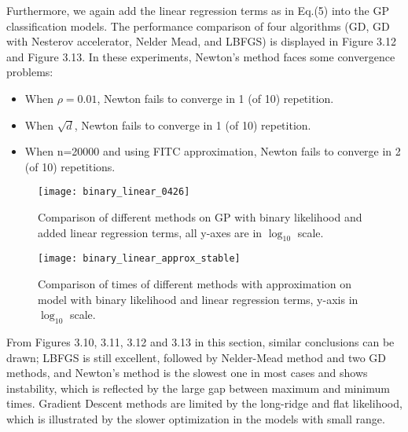 Furthermore, we again add the linear regression terms as in Eq.(5) into the GP classification models. The performance comparison of four algorithms (GD, GD with Nesterov accelerator, Nelder Mead, and LBFGS) is displayed in Figure 3.12 and Figure 3.13. In these experiments, Newton's method faces some convergence problems:

\begin{itemize}
    \item When $\rho=0.01$, Newton fails to converge in 1 (of 10) repetition.
    \item When $\sqrt d$, Newton fails to converge in 1 (of 10) repetition.
    \item When n=20000 and using FITC approximation, Newton fails to converge in 2 (of 10) repetitions.
\end{itemize}

\begin{figure}[hbt!]%
  \centering
  \texttt{[image: binary\_linear\_0426]} %
  \caption[Times of GP-Matern with Binary likelihood and linear regression terms: line graphs with range bars]%
  {Comparison of different methods on GP with binary likelihood and added linear regression terms, all y-axes are in $\log_{10}$ scale.}%
  \label{fig:binary_linear}
\end{figure}

\begin{figure}[hbt!]%
  \centering
  \texttt{[image: binary\_linear\_approx\_stable]} %
  \caption[Times of GP-Matern with binary likelihood and linear regression terms using approximation: line graphs with range bars]%
  {Comparison of times of different methods with approximation on model with binary likelihood and linear regression terms, y-axis in $\log_{10}$ scale.}%
  \label{fig:linear_iteration}
\end{figure}

From Figures 3.10, 3.11, 3.12 and 3.13 in this section, similar conclusions can be drawn; LBFGS is still excellent, followed by Nelder-Mead method and two GD methods, and Newton's method is the slowest one in most cases and shows instability, which is reflected by the large gap between maximum and minimum times. Gradient Descent methods are limited by the long-ridge and flat likelihood, which is illustrated by the slower optimization in the models with small range.

